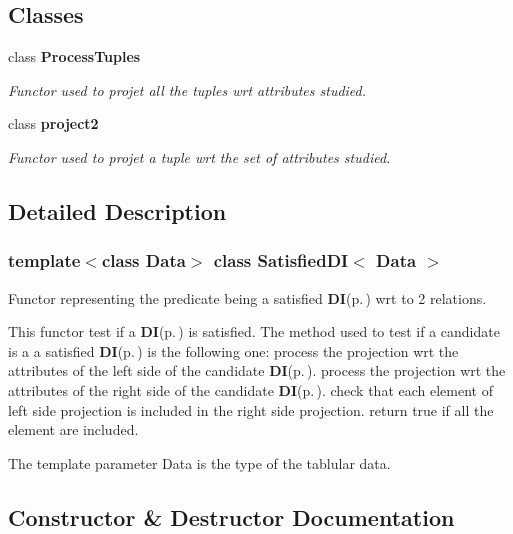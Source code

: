 \subsection*{Classes}
\begin{CompactItemize}
\item 
class {\bf Process\-Tuples}
\begin{CompactList}\small\item\em Functor used to projet all the tuples wrt attributes studied. \item\end{CompactList}\item 
class {\bf project2}
\begin{CompactList}\small\item\em Functor used to projet a tuple wrt the set of attributes studied. \item\end{CompactList}\end{CompactItemize}


\subsection{Detailed Description}
\subsubsection*{template$<$class Data$>$ class Satisfied\-DI$<$ Data $>$}

Functor representing the predicate being a satisfied {\bf DI}{\rm (p.\,\pageref{class_d_i})} wrt to 2 relations. 

This functor test if a {\bf DI}{\rm (p.\,\pageref{class_d_i})} is satisfied. The method used to test if a candidate is a a satisfied {\bf DI}{\rm (p.\,\pageref{class_d_i})} is the following one: process the projection wrt the attributes of the left side of the candidate {\bf DI}{\rm (p.\,\pageref{class_d_i})}. process the projection wrt the attributes of the right side of the candidate {\bf DI}{\rm (p.\,\pageref{class_d_i})}. check that each element of left side projection is included in the right side projection. return true if all the element are included.

The template parameter Data is the type of the tablular data. 



\subsection{Constructor \& Destructor Documentation}
